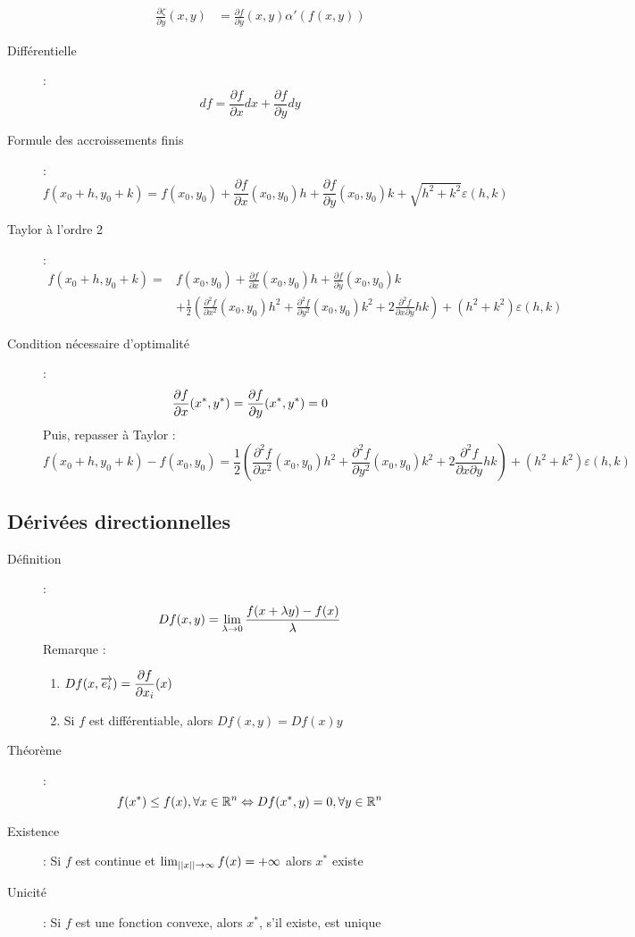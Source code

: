 \begin{description}
\begin{enumerate}
\begin{align*}
            \frac{\partial\zeta}{\partial y}(x,y)
            &=
            \frac{\partial f}{\partial y}(x,y)
            \alpha'(f(x,y))
        \end{align*}
\end{enumerate}
\item[Différentielle] :
    \[
        df=\frac{\partial f}{\partial x}dx
        +\frac{\partial f}{\partial y}dy
    \]
\item[Formule des accroissements finis] :
    \[
        f(x_0+h,y_0+k)=
        f(x_0,y_0)
        +\frac{\partial f}{\partial x}(x_0,y_0)h
        +\frac{\partial f}{\partial y}(x_0,y_0)k
        +\sqrt{h^2+k^2}\varepsilon(h,k)
    \]
\item[Taylor à l'ordre 2] :
    \begin{align*}
        f(x_0+h,y_0+k)
        =&
        f(x_0,y_0)
        +\frac{\partial f}{\partial x}(x_0,y_0)h
        +\frac{\partial f}{\partial y}(x_0,y_0)k\\
        &+\frac{1}{2}\left(
            \frac{\partial^2f}{\partial x^2}(x_0,y_0)h^2
            +\frac{\partial^2f}{\partial y^2}(x_0,y_0)k^2
            +2\frac{\partial^2f}{\partial x\partial y}hk
        \right)
        + (h^2+k^2)\varepsilon(h,k)
    \end{align*}
\item[Condition nécessaire d'optimalité] :
    \[
        \dfrac{\partial f}{\partial x}(x^*,y^*)=
        \dfrac{\partial f}{\partial y}(x^*,y^*)=0
    \]
    Puis, repasser à Taylor :
    \[
        f(x_0+h,y_0+k)-f(x_0,y_0)=
        \frac{1}{2}\left(
            \frac{\partial^2f}{\partial x^2}(x_0,y_0)h^2
            +\frac{\partial^2f}{\partial y^2}(x_0,y_0)k^2
            +2\frac{\partial^2f}{\partial x\partial y}hk
        \right)
        + (h^2+k^2)\varepsilon(h,k)
    \]
\end{description}
\subsection{Dérivées directionnelles}
\begin{description}
\item[Définition] :
    \[
        Df(x,y)=\lim_{\lambda\rightarrow0}\frac{f(x+\lambda y)-f(x)}{\lambda}
    \]
    Remarque :
    \begin{enumerate}
        \item $Df(x,\overrightarrow{e_i})=\dfrac{\partial f}{\partial x_i}(x)$
        \item Si $f$ est différentiable, alors $Df(x,y)=Df(x)y$
    \end{enumerate}
\item[Théorème] :
    \[
        f(x^*)\le f(x),\forall x\in\mathbb{R}^n
        \Leftrightarrow
        Df(x^*,y)=0, \forall y\in\mathbb{R}^n
    \]
\item[Existence] : Si $f$ est continue et $\lim_{||x||\rightarrow\infty}f(x)=+\infty$ alors $x^*$ existe
\item[Unicité] : Si $f$ est une fonction convexe, alors $x^*$, s'il existe, est unique
\end{description}
